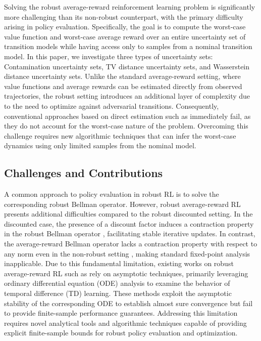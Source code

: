 Solving the robust average-reward reinforcement learning problem is significantly more challenging than its non-robust counterpart, with the primary difficulty arising in policy evaluation. Specifically, the goal is to compute the worst-case value function and worst-case average reward over an entire uncertainty set of transition models while having access only to samples from a nominal transition model. In this paper, we investigate three types of uncertainty sets: Contamination uncertainty sets, TV distance uncertainty sets, and Wasserstein distance uncertainty sets. Unlike the standard average-reward setting, where value functions and average rewards can be estimated directly from observed trajectories, the robust setting introduces an additional layer of complexity due to the need to optimize against adversarial transitions. Consequently, conventional approaches based on direct estimation such as \citep{wei2020model, agarwal2021theory} immediately fail, as they do not account for the worst-case nature of the problem. Overcoming this challenge requires new algorithmic techniques that can infer the worst-case dynamics using only limited samples from the nominal model.

\subsection{Challenges and Contributions}

A common approach to policy evaluation in robust RL is to solve the corresponding robust Bellman operator. However, robust average-reward RL presents additional difficulties compared to the robust discounted setting. In the discounted case, the presence of a discount factor induces a contraction property in the robust Bellman operator \citep{wang2022policy, zhou2024natural}, facilitating stable iterative updates. In contrast, the average-reward Bellman operator lacks a contraction property with respect to any norm even in the non-robust setting \citep{zhang2021finite}, making standard fixed-point analysis inapplicable. Due to this fundamental limitation, existing works on robust average-reward RL such as  \citep{wang2023model} rely on asymptotic techniques, primarily leveraging ordinary differential equation (ODE) analysis to examine the behavior of temporal difference (TD) learning. These methods exploit the asymptotic stability of the corresponding ODE \citep{borkar2023stochastic} to establish almost sure convergence but fail to provide finite-sample performance guarantees. Addressing this limitation requires novel analytical tools and algorithmic techniques capable of providing explicit finite-sample bounds for robust policy evaluation and optimization.

